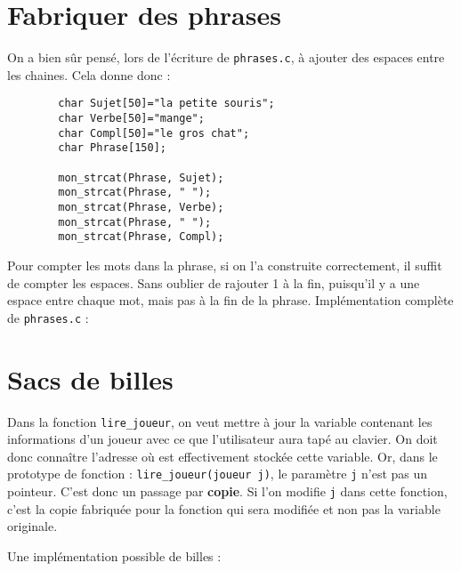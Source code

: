 \documentclass[10pt]{article}
\begin{document}
\section{Fabriquer des phrases}

\begin{enumerate}[label=\textbf{[\alph*]},resume]
  \setlength\itemsep{1em}

\item On a bien sûr pensé, lors de l'écriture de \texttt{phrases.c}, à
  ajouter des espaces entre les chaines. Cela donne donc :

  \begin{lstlisting}
        char Sujet[50]="la petite souris";
        char Verbe[50]="mange";
        char Compl[50]="le gros chat";
        char Phrase[150];

        mon_strcat(Phrase, Sujet);
        mon_strcat(Phrase, " ");
        mon_strcat(Phrase, Verbe);
        mon_strcat(Phrase, " ");
        mon_strcat(Phrase, Compl);
  \end{lstlisting}

\item Pour compter les mots dans la phrase, si on l'a construite
  correctement, il suffit de compter les espaces. Sans oublier de
  rajouter 1 à la fin, puisqu'il y a une espace entre chaque mot, mais
  pas à la fin de la phrase. Implémentation complète de
  \texttt{phrases.c} :

  \vspace{0.5cm}

  

\end{enumerate}

\section{Sacs de billes}


\begin{enumerate}[label=\textbf{[\alph*]},resume]
  \setlength\itemsep{1em}

\item Dans la fonction \texttt{lire\_joueur}, on veut mettre à jour la
  variable contenant les informations d'un joueur avec ce que
  l'utilisateur aura tapé au clavier. On doit donc connaître l'adresse
  où est effectivement stockée cette variable. Or, dans le prototype
  de fonction : \texttt{lire\_joueur(joueur j)}, le paramètre
  \texttt{j} n'est pas un pointeur. C'est donc un passage par
  \textbf{copie}. Si l'on modifie \texttt{j} dans cette fonction,
  c'est la copie fabriquée pour la fonction qui sera modifiée et non
  pas la variable originale.

\item Une implémentation possible de billes :

\vspace{0.5cm}

  

\end{enumerate}
\end{document}
